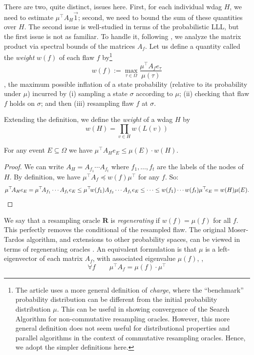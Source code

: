 \documentclass{toc}
\begin{document}
There are two, quite distinct, issues here. First, for each individual wdag $H$, we need to estimate $\mu^{\top} A_H \vec 1 $; second, we need to bound the sum of these quantities over $H$. The second issue is well-studied in terms of the probabilistic LLL, but the first issue is not as familiar. To handle it, following \cite{AIS}, we analyze the matrix product via  spectral bounds of the matrices $A_f$.  Let us define a quantity called the \emph{weight} $w(f)$ of each flaw $f$ by\footnote{The
%
article  %
  \cite{AIS} uses a more general definition of \emph{charge}, where the ``benchmark'' probability distribution can be different from the initial probability distribution $\mu$. This can be useful in showing convergence of the Search Algorithm for non-commutative resampling oracles. However, this more general definition does not seem useful for distributional properties and parallel algorithms in the context of commutative resampling oracles. Hence, we adopt the simpler definitions here.}
$$
w(f) :=  \max_{\tau \in \Omega}  \frac{\mu^{\top} A_f e_{\tau}}{ \mu(\tau) } 
$$\ie, the maximum possible inflation of a state probability (relative to its probability under $\mu$) incurred by (i) sampling a state $\sigma$ according to $\mu$; (ii) checking that flaw $f$ holds on $\sigma$; and then (iii) resampling flaw $f$ at $\sigma$.



Extending the definition, we define the \emph{weight} of a wdag $H$ by
$$
w(H) = \prod_{v \in H} w(L(v))
$$
\begin{lemma}
  \label{a1}
  For any event $E \subseteq \Omega$ we have $\mu^{\top} A_H e_E \leq  \mu(E) \cdot w(H)$.   
\end{lemma}
\begin{proof}
We can write $A_H = A_{f_1} \cdots A_{f_t}$ where $f_1, \dots, f_t$ are the labels of the nodes of $H$.  By definition, we have $\mu^{\top} A_f \preceq w(f)  \mu^{\top}$ for any $f$. So:
\[
 \mu^{\top} \negthinspace A_H e_E =   \mu^{\top} \negthinspace A_{f_1} \cdots A_{f_t} e_E  \leq \mu^{\top} \negthinspace w(f_1) A_{f_2} \cdots A_{f_t} e_E \leq \dots \leq w(f_1) \cdots w(f_t) \mu^{\top} \negthinspace e_E = w(H) \mu(E).   \qedhere
\]
\end{proof}


We say that a resampling oracle $\mathbf R$ is \emph{regenerating} if $w(f) = \mu(f)$ for all $f$. This perfectly removes the conditional of the resampled flaw.   The original Moser-Tardos algorithm, and extensions to other probability spaces, can be viewed in terms of regenerating oracles \cite{HV}. An equivalent formulation is that  $\mu$ is a left-eigenvector of each matrix $A_f$, with associated eigenvalue $\mu(f)$, \ie,
\begin{equation}
\label{regen-def}
\forall f \qquad \mu^{\top} A_f = \mu(f) \cdot \mu^{\top}
\end{equation}
\end{document}
